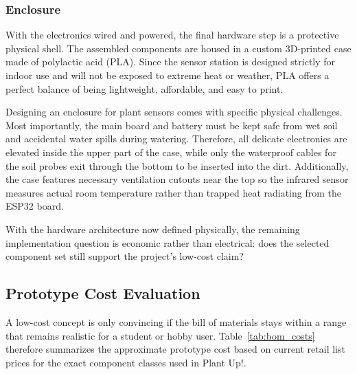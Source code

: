 \subsubsection*{Enclosure}

With the electronics wired and powered, the final hardware step is a protective physical shell. The assembled components are housed in a custom 3D-printed case made of polylactic acid (PLA). Since the sensor station is designed strictly for indoor use and will not be exposed to extreme heat or weather, PLA offers a perfect balance of being lightweight, affordable, and easy to print.

Designing an enclosure for plant sensors comes with specific physical challenges. Most importantly, the main board and battery must be kept safe from wet soil and accidental water spills during watering. Therefore, all delicate electronics are elevated inside the upper part of the case, while only the waterproof cables for the soil probes exit through the bottom to be inserted into the dirt. Additionally, the case features necessary ventilation cutouts near the top so the infrared sensor measures actual room temperature rather than trapped heat radiating from the ESP32 board. 

With the hardware architecture now defined physically, the remaining implementation question is economic rather than electrical: does the selected component set still support the project's low-cost claim?

\subsection{Prototype Cost Evaluation}

A low-cost concept is only convincing if the bill of materials stays within a range that remains realistic for a student or hobby user. Table~\ref{tab:bom_costs} therefore summarizes the approximate prototype cost based on current retail list prices for the exact component classes used in Plant Up!.

